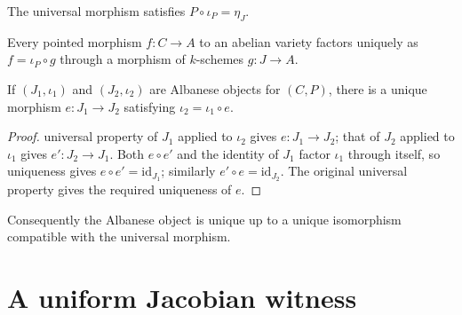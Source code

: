 \begin{lemma}\label{mk-lem:IsAlbanese_comp_ofCurve}
  \leanok

  The universal morphism satisfies \(P \circ \iota_P = \eta_J\).
\end{lemma}

\begin{lemma}\label{mk-lem:IsAlbanese_exists_unique_ofCurve_comp}
  \leanok

  Every pointed morphism \(f \colon C \to A\) to an abelian variety factors
  uniquely as \(f=\iota_P\circ g\) through a morphism of \(k\)-schemes
  \(g \colon J \to A\).
\end{lemma}

\begin{theorem}\label{mk-thm:IsAlbanese_unique}
  \leanok

  If \((J_1,\iota_1)\) and \((J_2,\iota_2)\) are Albanese objects for
  \((C,P)\), there is a unique morphism \(e \colon J_1\to J_2\) satisfying
  \(\iota_2=\iota_1\circ e\).
\end{theorem}

\begin{proof}
  \leanokThe universal property of \(J_1\) applied to \(\iota_2\) gives
  \(e \colon J_1\to J_2\); that of \(J_2\) applied to \(\iota_1\) gives
  \(e' \colon J_2\to J_1\).  Both \(e\circ e'\) and the identity of \(J_1\)
  factor \(\iota_1\) through itself, so uniqueness gives
  \(e\circ e'=\mathrm{id}_{J_1}\); similarly
  \(e'\circ e=\mathrm{id}_{J_2}\).  The original universal property gives the
  required uniqueness of \(e\).
\end{proof}

\begin{remark}
  \label{mk-rem:IsAlbanese_unique_iso}
  Consequently the Albanese object is unique up to a unique isomorphism
  compatible with the universal morphism.
\end{remark}

\section{A uniform Jacobian witness}

